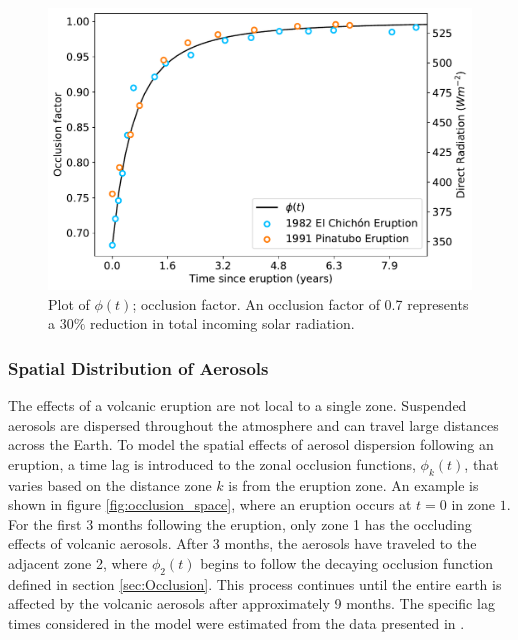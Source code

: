 \documentclass[12pt]{article}
\begin{document}
\begin{figure}[H]
    \centering
    \includegraphics[scale=0.6]{occlusion.pdf}
    \caption{
        Plot of $\phi(t)$; occlusion factor. An occlusion factor of 0.7
        represents a $30\%$ reduction in total incoming solar radiation.
    }
    \label{fig:occlusion}
\end{figure}
\FloatBarrier

\subsubsection{Spatial Distribution of Aerosols} \label{sec:Spatial_Occlusion}
The effects of a volcanic eruption are not local to a single zone. Suspended
aerosols are dispersed throughout the atmosphere and can travel large distances
across the Earth. To model the spatial effects of aerosol dispersion following
an eruption, a time lag is introduced to the zonal occlusion functions,
$\phi_k(t)$, that varies based on the distance zone $k$ is from the eruption
zone. An example is shown in figure \ref{fig:occlusion_space}, where an eruption
occurs at $t=0$ in zone $1$. For the first $3$ months following the eruption,
only zone 1 has the occluding effects of volcanic aerosols. After $3$ months,
the aerosols have traveled to the adjacent zone 2, where $\phi_2(t)$ begins
to follow the decaying occlusion function defined in section \ref{sec:Occlusion}.
This process continues until the entire earth is affected by the volcanic
aerosols after approximately 9 months. The specific lag times considered in the
model were estimated from the data presented in \cite{robock}.
\end{document}
